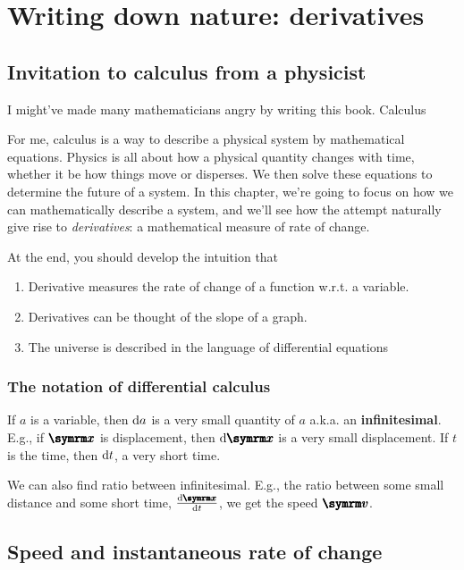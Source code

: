 \chapter{Writing down nature: derivatives}
\label{sec:derivatives}

\section{Invitation to calculus from a physicist}


I might've made many mathematicians angry by writing this book. Calculus

For me, calculus is a way to describe a physical system by mathematical equations. Physics is all about how a physical quantity changes with time, whether it be how things move or disperses. We then solve these equations to determine the future of a system. In this chapter, we're going to focus on how we can mathematically describe a system, and we'll see how the attempt naturally give rise to \emph{derivatives}: a mathematical measure of rate of change.

At the end, you should develop the intuition that
\begin{enumerate}[noitemsep]
    \item Derivative measures the rate of change of a function w.r.t. a variable.
    \item Derivatives can be thought of the slope of a graph.
    \item The universe is described in the language of differential equations
\end{enumerate}

\subsection{The notation of differential calculus}
\label{sec:notation_of_calculus_derivative}

If $a$ is a variable, then $\odif{a}$ is a very small quantity of $a$ a.k.a. an \textbf{infinitesimal}. E.g., if $\vv{x}$ is displacement, then $\odif{\vv{x}}$ is a very small displacement. If $t$ is the time, then $\odif{t}$, a very short time.

We can also find ratio between infinitesimal. E.g., the ratio between some small distance and some short time, $\odv{\vv{x}}{t}$, we get the speed $\vv{v}$.

\section{Speed and instantaneous rate of change}
\label{sec:speedandinstantaneousrateofchange}


